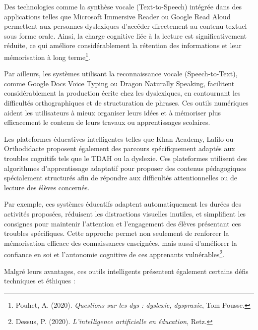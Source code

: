 \documentclass[12pt,a4paper]{report}
\begin{document}
Des technologies comme la synthèse vocale (Text-to-Speech) intégrée dans des applications telles que Microsoft Immersive Reader ou Google Read Aloud permettent aux personnes dyslexiques d’accéder directement au contenu textuel sous forme orale. Ainsi, la charge cognitive liée à la lecture est significativement réduite, ce qui améliore considérablement la rétention des informations et leur mémorisation à long terme\footnote{Pouhet, A. (2020). \textit{Questions sur les dys : dyslexie, dyspraxie}, Tom Pousse.}.

Par ailleurs, les systèmes utilisant la reconnaissance vocale (Speech-to-Text), comme Google Docs Voice Typing ou Dragon Naturally Speaking, facilitent considérablement la production écrite chez les dyslexiques, en contournant les difficultés orthographiques et de structuration de phrases. Ces outils numériques aident les utilisateurs à mieux organiser leurs idées et à mémoriser plus efficacement le contenu de leurs travaux ou apprentissages scolaires.

Les plateformes éducatives intelligentes telles que Khan Academy, Lalilo ou Orthodidacte proposent également des parcours spécifiquement adaptés aux troubles cognitifs tels que le TDAH ou la dyslexie. Ces plateformes utilisent des algorithmes d’apprentissage adaptatif pour proposer des contenus pédagogiques spécialement structurés afin de répondre aux difficultés attentionnelles ou de lecture des élèves concernés.

Par exemple, ces systèmes éducatifs adaptent automatiquement les durées des activités proposées, réduisent les distractions visuelles inutiles, et simplifient les consignes pour maintenir l’attention et l’engagement des élèves présentant ces troubles spécifiques. Cette approche permet non seulement de renforcer la mémorisation efficace des connaissances enseignées, mais aussi d’améliorer la confiance en soi et l’autonomie cognitive de ces apprenants vulnérables\footnote{Dessus, P. (2020). \textit{L’intelligence artificielle en éducation}, Retz.}.

Malgré leurs avantages, ces outils intelligents présentent également certains défis techniques et éthiques :
\end{document}
